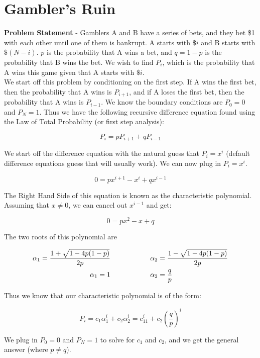 \documentclass[11pt]{article}
\theoremstyle{definition}
\theoremstyle{remark}
\begin{document}
\section{Gambler's Ruin}


\textbf{Problem Statement} - Gamblers A and B have a series of bets, and they bet \$1 with each other until one of them is bankrupt. A starts with $\$i$ and B starts with $\$(N-i)$. $p$ is the probability that A wins a bet, and $q=1-p$ is the probability that B wins the bet. We wish to find $P_i$, which is the probability that A wins this game given that A starts with $\$i$. \\

We start off this problem by conditioning on the first step. If A wins the first bet, then the probability that A wins is $P_{i+1}$, and if A loses the first bet, then the probability that A wins is $P_{i-1}$. We know the boundary conditions are $P_0 = 0$ and $P_N = 1$. Thus we have the following recursive difference equation found using the Law of Total Probability (or first step analysis):

\[P_i = pP_{i+1} + qP_{i-1}\]

\pagebreak

We start off the difference equation with the natural guess that $P_i = x^i$ (default difference equations guess that will usually work). We can now plug in $P_i = x^i$.

\[0 = px^{i+1} - x^i + qx^{i-1}\]

The Right Hand Side of this equation is known as the characteristic polynomial. Assuming that $x \neq 0$, we can cancel out $x^{i-1}$ and get:

\[0 = px^2 - x + q\]

 The two roots of this polynomial are

\begin{align*}
\alpha_1 = \frac{1 + \sqrt{1 - 4p(1-p)}}{2p} \hskip 1cm & \hskip 1cm \alpha_2 =  \frac{1 - \sqrt{1 - 4p(1-p)}}{2p} \\
\alpha_1 = 1 \hskip 1cm & \hskip 1cm \alpha_2 =  \frac{q}{p}
\end{align*}

Thus we know that our characteristic polynomial is of the form:

\[P_i = c_1\alpha_1^i + c_2\alpha_2^i = c_11^i + c_2\left(\frac{q}{p}\right)^i\]

We plug in $P_0 = 0$ and $P_N = 1$ to solve for $c_1$ and $c_2$, and we get the general answer (where $p\neq q$).
\end{document}
